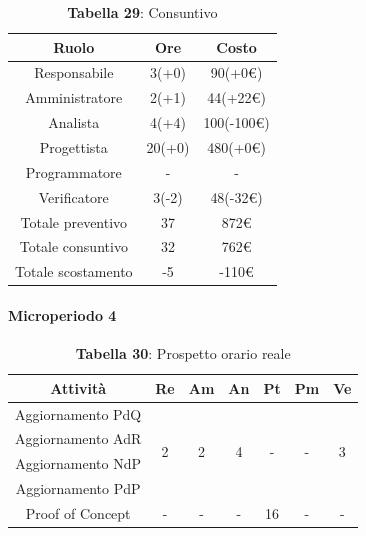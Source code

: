 \begin{table}[H]
	\centering
	\renewcommand{\arraystretch}{1.5}
	\begin{tabular}{|c|c|c|}
		\hline
		\rowcolor{lighter-grayer}
		Ruolo & Ore & Costo \\ \hline
		Responsabile & 3(+0) & 90(+0\euro) \\ \hline
		Amministratore & 2(+1) & 44(+22\euro) \\ \hline
		Analista & 4(+4) & 100(-100\euro) \\ \hline
		Progettista & 20(+0) & 480(+0\euro) \\ \hline
		Programmatore & - & - \\ \hline
		Verificatore & 3(-2) & 48(-32\euro) \\ \hline
		Totale preventivo & 37 & 872\euro \\ \hline
		Totale consuntivo & 32 & 762\euro \\ \hline
		Totale scostamento & -5 & -110\euro \\ \hline
	\end{tabular}
	\caption*{\textbf{Tabella 29}: Consuntivo\\}
\end{table}

\paragraph{Microperiodo 4}
\begin{table}[H]
	\centering
	\begin{tabular}{|c|c|c|c|c|c|c|}
		\hline
		\rowcolor{lighter-grayer}
		\textbf{Attività} & \textbf{Re}        & \textbf{Am}        & \textbf{An}        & \textbf{Pt}        & \textbf{Pm}        & \textbf{Ve}        \\ \hline
		Aggiornamento PdQ & \multirow{4}{*}{2} & \multirow{4}{*}{2} & \multirow{4}{*}{4} & \multirow{4}{*}{-} & \multirow{4}{*}{-} & \multirow{4}{*}{3} \\ \cline{1-1}
		Aggiornamento AdR &                    &                    &                    &                    &                    &                    \\ \cline{1-1}
		Aggiornamento NdP &                    &                    &                    &                    &                    &                    \\ \cline{1-1}
		Aggiornamento PdP &                    &                    &                    &                    &                    &                    \\ \hline
		Proof of Concept               & -                  & -                  & -                  & 16                 & -                  & -                  \\ \hline
	\end{tabular}
\caption*{\textbf{Tabella 30}: Prospetto orario reale\\}
\end{table}

